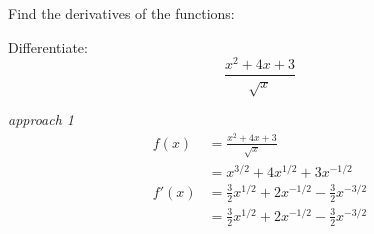 \documentclass[fleqn,addpoints]{exam}
\begin{document}
\begin{questions}
\begin{parts}
\begin{solution}
\end{solution}

\end{parts}

\question Find the derivatives of the functions:

\question Differentiate:
\[
  \frac{x^2 + 4x + 3}{\sqrt{x}}
\]

\begin{solution}
{\em approach 1}
\begin{align*}
  f(x) &= \frac{x^2 + 4x + 3}{\sqrt{x}} \\
       &= x^{3/2} + 4x^{1/2} + 3x^{-1/2} \\
  f'(x) &= \frac{3}{2}x^{1/2} + 2x^{-1/2} - \frac{3}{2} x^{-3/2} \\
        &= \frac{3}{2}x^{1/2} + 2x^{-1/2} - \frac{3}{2} x^{-3/2} \\
\end{align*}

\end{solution}

\ifprintanswers
\pagebreak
\fi


\end{questions}
\end{document}
